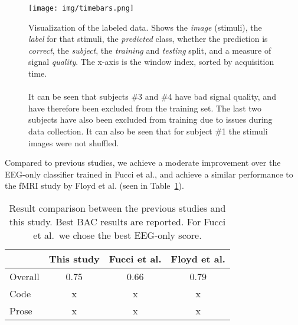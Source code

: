         \begin{landscape}
            \begin{figure}
                \centering
                \texttt{[image: img/timebars.png]}
                \caption{Visualization of the labeled data. Shows the \emph{image} (stimuli), the \emph{label} for that stimuli, the \emph{predicted} class, whether the prediction is \emph{correct}, the \emph{subject}, the \emph{training} and \emph{testing} split, and a measure of signal \emph{quality}. The x-axis is the window index, sorted by acquisition time.
                \\ 
                \\
                It can be seen that subjects \#3 and \#4 have bad signal quality, and have therefore been excluded from the training set. The last two subjects have also been excluded from training due to issues during data collection. It can also be seen that for subject \#1 the stimuli images were not shuffled.}\label{fig:timebars}
            \end{figure}
        \end{landscape}

        \begin{comment}
            \begin{figure}[h]
            \centering
            \texttt{[image: img/roccurve.png]}
            \caption{Receiver operating characteristic (ROC) curve for subject \#6.}\label{fig:roc}
            \end{figure}
            \todo[inline]{Update with higher-res image}
        \end{comment}

        Compared to previous studies, we achieve a moderate improvement over the EEG-only classifier trained in Fucci et al., and achieve a similar performance to the fMRI study by Floyd et al. (seen in Table~\ref{table:compare-results}).

        \begin{table}
            \begin{center}
                \begin{tabular}{lccc}
                    \toprule
                    & \textbf{This study} & \textbf{Fucci et al.} & \textbf{Floyd et al.} \\
                    \midrule
                    Overall & 0.75 & 0.66 & 0.79 \\
                    Code & x & x & x \\
                    Prose & x & x & x \\
                    \bottomrule
                \end{tabular}
                \caption{Result comparison between the previous studies and this study. Best BAC results are reported. For Fucci et al.\ we chose the best EEG-only score.}\label{table:compare-results}
            \end{center}
        \end{table}


